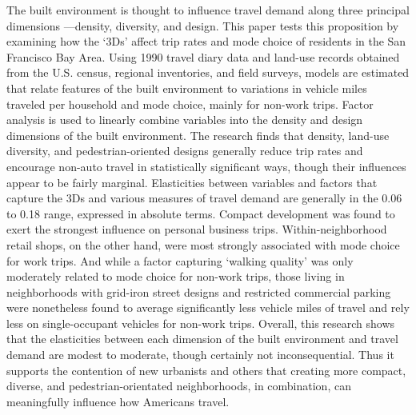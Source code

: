 The built environment is thought to influence travel demand along three principal dimensions —density, diversity, and design. This paper tests this proposition by examining how the ‘3Ds’ affect trip rates and mode choice of residents in the San Francisco Bay Area. Using 1990 travel diary data and land-use records obtained from the U.S. census, regional inventories, and field surveys, models are estimated that relate features of the built environment to variations in vehicle miles traveled per household and mode choice, mainly for non-work trips. Factor analysis is used to linearly combine variables into the density and design dimensions of the built environment. The research finds that density, land-use diversity, and pedestrian-oriented designs generally reduce trip rates and encourage non-auto travel in statistically significant ways, though their influences appear to be fairly marginal. Elasticities between variables and factors that capture the 3Ds and various measures of travel demand are generally in the 0.06 to 0.18 range, expressed in absolute terms. Compact development was found to exert the strongest influence on personal business trips. Within-neighborhood retail shops, on the other hand, were most strongly associated with mode choice for work trips. And while a factor capturing ‘walking quality’ was only moderately related to mode choice for non-work trips, those living in neighborhoods with grid-iron street designs and restricted commercial parking were nonetheless found to average significantly less vehicle miles of travel and rely less on single-occupant vehicles for non-work trips. Overall, this research shows that the elasticities between each dimension of the built environment and travel demand are modest to moderate, though certainly not inconsequential. Thus it supports the contention of new urbanists and others that creating more compact, diverse, and pedestrian-orientated neighborhoods, in combination, can meaningfully influence how Americans travel.